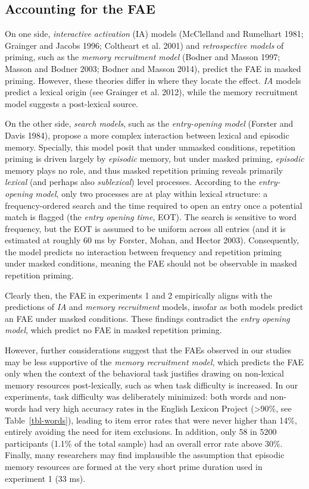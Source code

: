 \documentclass[
]{interact}
\begin{document}
\subsection{Accounting for the FAE}\label{accounting-for-the-fae}

On one side, \emph{interactive activation} (IA) models (McClelland and
Rumelhart 1981; Grainger and Jacobs 1996; Coltheart et al. 2001) and
\emph{retrospective models} of priming, such as the \emph{memory
recruitment model} (Bodner and Masson 1997; Masson and Bodner 2003;
Bodner and Masson 2014), predict the FAE in masked priming. However,
these theories differ in where they locate the effect. \emph{IA} models
predict a lexical origin (see Grainger et al. 2012), while the memory
recruitment model suggests a post-lexical source.

On the other side, \emph{search models}, such as the \emph{entry-opening
model} (Forster and Davis 1984), propose a more complex interaction
between lexical and episodic memory. Specially, this model posit that
under unmasked conditions, repetition priming is driven largely by
\emph{episodic} memory, but under masked priming, \emph{episodic} memory
plays no role, and thus masked repetition priming reveals primarily
\emph{lexical} (and perhaps also \emph{sublexical}) level processes.
According to the \emph{entry-opening model}, only two processes are at
play within lexical structure: a frequency-ordered search and the time
required to open an entry once a potential match is flagged (the
\emph{entry opening time}, EOT). The search is sensitive to word
frequency, but the EOT is assumed to be uniform across all entries (and
it is estimated at roughly 60 ms by Forster, Mohan, and Hector 2003).
Consequently, the model predicts no interaction between frequency and
repetition priming under masked conditions, meaning the FAE should not
be observable in masked repetition priming.

Clearly then, the FAE in experiments 1 and 2 empirically aligns with the
predictions of \emph{IA} and \emph{memory recruitment} models, insofar
as both models predict an FAE under masked conditions. These findings
contradict the \emph{entry opening model}, which predict no FAE in
masked repetition priming.

However, further considerations suggest that the FAEs observed in our
studies may be less supportive of the \emph{memory recruitment model},
which predicts the FAE only when the context of the behavioral task
justifies drawing on non-lexical memory resources post-lexically, such
as when task difficulty is increased. In our experiments, task
difficulty was deliberately minimized: both words and non-words had very
high accuracy rates in the English Lexicon Project (\textgreater90\%,
see Table~\ref{tbl-words}), leading to item error rates that were never
higher than 14\%, entirely avoiding the need for item exclusions. In
addition, only 58 in 5200 participants (1.1\% of the total sample) had
an overall error rate above 30\%. Finally, many researchers may find
implausible the assumption that episodic memory resources are formed at
the very short prime duration used in experiment 1 (33 ms).
\end{document}
